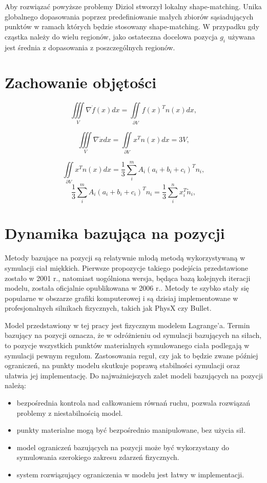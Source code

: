 Aby rozwiązać powyższe problemy Diziol \cite{diziol} stworzył lokalny
shape-matching.  Unika globalnego dopasowania poprzez predefiniowanie małych
zbiorów sąsiadujących punktów w ramach których będzie stosowany shape-matching.
W przypadku gdy cząstka należy do wielu regionów, jako ostateczna docelowa
pozycja $g_i$ używana jest średnia z dopasowania z poszczególnych regionów.

\section{Zachowanie objętości}
$$\iiint\limits_V \nabla \dot f(x) dx = \iint\limits_{\partial V} f(x)^T n(x) dx,$$

$$\iiint\limits_V \nabla \dot x dx = \iint\limits_{\partial V} x^T n(x) dx = 3 V,$$

$$ \iint\limits_{\partial V} x^T n(x) dx = \frac{1}{3} \sum_i^m A_i (a_i + b_i +
		c_i)^T n_i,$$
$$ \frac{1}{3} \sum_i^m A_i (a_i + b_i + c_i)^T n_i = \frac{1}{3}\sum_i^n x_i^T
\tilde{n}_i,$$
\section{Dynamika bazująca na pozycji}

Metody bazujące na pozycji są relatywnie młodą metodą wykorzystywaną w symulacji
ciał miękkich. Pierwsze propozycje takiego podejścia przedstawione zostało w
2001 r.\cite{jak}, natomiast uogólniona wersja, będąca bazą kolejnych
iteracji modelu, została oficjalnie opublikowana w 2006 r.\cite{pbdyn}. Metody te
szybko stały się popularne w obszarze grafiki komputerowej i są dzisiaj
implementowane w profesjonalnych silnikach fizycznych, takich jak PhysX czy
Bullet.

Model przedstawiony w tej pracy jest fizycznym modelem Lagrange'a. Termin
bazujący na pozycji oznacza, że w odróżnieniu od symulacji bazujących na siłach, to pozycje
wszystkich punktów materialnych symulowanego ciała podlegają w symulacji pewnym
regułom. Zastosowania reguł, czy jak to będzie zwane później ograniczeń, na
punkty modelu skutkuje poprawą stabilności symulacji oraz ułatwia jej
implementację. Do najważniejszych zalet modeli bazujących na pozycji należą:
\begin{itemize}
	\item bezpośrednia kontrola nad całkowaniem równań ruchu, pozwala rozwiązań
	problemy z niestabilnością model.
	\item punkty materialne mogą być bezpośrednio manipulowane, bez użycia sił.
	\item model ograniczeń bazujących na pozycji może być wykorzystany do
	symulowania szerokiego zakresu zdarzeń fizycznych.
	\item system rozwiązujący ograniczenia w modelu jest łatwy w implementacji.
\end{itemize}

